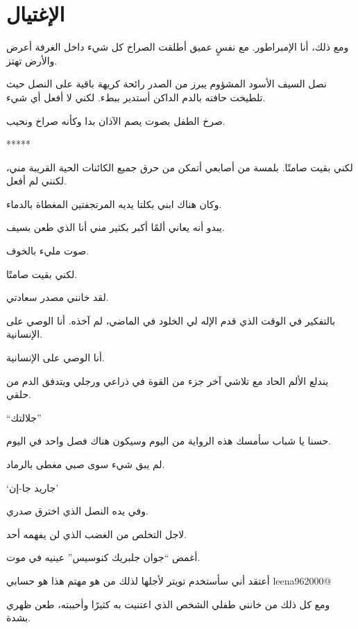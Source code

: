 \chapter{الإغتيال}


ومع ذلك، أنا الإمبراطور.
مع نفسٍ عميق أطلقت الصراخ كل شيء داخل الغرفة أعرض والأرض تهتز.

نصل السيف الأسود المشؤوم يبرز من الصدر رائحة كريهة باقية على النصل حيث تلطيخت حافته بالدم الداكن أستدير ببطء.
لكني لا أفعل أي شيء.


صرخ الطفل بصوت يصم الآذان بدا وكأنه صراخ ونحيب.

*****





لكني بقيت صامتًا.
بلمسة من أصابعي أتمكن من حرق جميع الكائنات الحية القريبة مني، لكنني لم أفعل.





وكان هناك ابني بكلتا يديه المرتجفتين المغطاة بالدماء.





يبدو أنه يعاني ألمًا أكبر بكثير مني أنا الذي طعن بسيف.

صوت مليء بالخوف.



لكني بقيت صامتًا.


لقد خانني مصدر سعادتي.

بالتفكير في الوقت الذي قدم الإله لي الخلود في الماضي، لم آخذه.
أنا الوصي على الإنسانية.

أنا الوصي على الإنسانية.


يندلع الألم الحاد مع تلاشي آخر جزء من القوة في ذراعي ورجلي ويتدفق الدم من حلقي.



“جلالتك”

حسنا يا شباب سأمسك هذه الرواية من اليوم وسيكون هناك فصل واحد في اليوم.



لم يبق شيء سوى صبي مغطى بالرماد.

‘جاريد جا-إن’



وفي يده النصل الذي اخترق صدري.


لاجل التخلص من الغضب الذي لن يفهمه أحد.


أغمض “جوان جلبريك كنوسيس” عينيه في موت.

أعتقد أني سأستخدم تويتر لأجلها لذلك من هو مهتم هذا هو حسابي leena962000@



ومع كل ذلك من خانني طفلي الشخص الذي اعتنيت به كثيرًا وأحببته، طعن ظهري بشدة.

